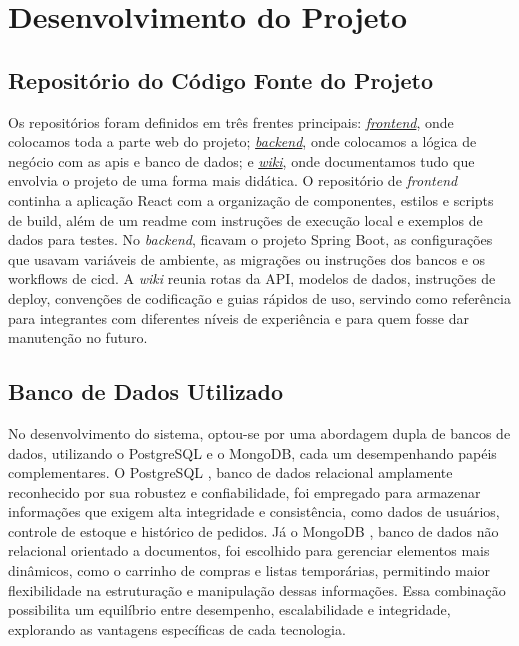 \section[Desenvolvimento do Projeto]{Desenvolvimento do Projeto}

\subsection{Repositório do Código Fonte do Projeto}
Os repositórios foram definidos em três frentes principais: \href{https://tools.ages.pucrs.br/se-doce-fosse/frontend}{\textit{frontend}}, onde colocamos toda a parte web do projeto; \href{https://tools.ages.pucrs.br/se-doce-fosse/backend}{\textit{backend}}, onde colocamos a lógica de negócio com as \ac{api}s e banco de dados; e \href{https://tools.ages.pucrs.br/se-doce-fosse/wiki}{\textit{wiki}}, onde documentamos tudo que envolvia o projeto de uma forma mais didática. O repositório de \textit{frontend} continha a aplicação React com a organização de componentes, estilos e scripts de build, além de um \ac{readme} com instruções de execução local e exemplos de dados para testes. No \textit{backend}, ficavam o projeto Spring Boot, as configurações que usavam variáveis de ambiente, as migrações ou instruções dos bancos e os workflows de \ac{cicd}. A \textit{wiki} reunia rotas da API, modelos de dados, instruções de deploy, convenções de codificação e guias rápidos de uso, servindo como referência para integrantes com diferentes níveis de experiência e para quem fosse dar manutenção no futuro.



\subsection{Banco de Dados Utilizado}
No desenvolvimento do sistema, optou-se por uma abordagem dupla de bancos de dados, utilizando o PostgreSQL e o MongoDB, cada um desempenhando papéis complementares. O PostgreSQL \cite{postgresql}, banco de dados relacional amplamente reconhecido por sua robustez e confiabilidade, foi empregado para armazenar informações que exigem alta integridade e consistência, como dados de usuários, controle de estoque e histórico de pedidos. Já o MongoDB \cite{mongodb}, banco de dados não relacional orientado a documentos, foi escolhido para gerenciar elementos mais dinâmicos, como o carrinho de compras e listas temporárias, permitindo maior flexibilidade na estruturação e manipulação dessas informações. Essa combinação possibilita um equilíbrio entre desempenho, escalabilidade e integridade, explorando as vantagens específicas de cada tecnologia.
  
